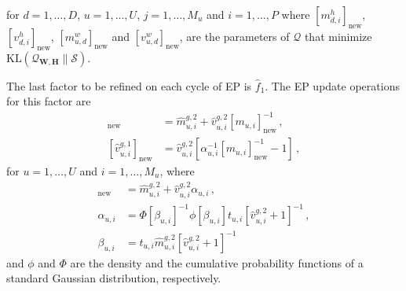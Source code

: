 for $d = 1,\ldots,D$, $u = 1,\ldots,U$, $j = 1,\ldots,M_u$ and $i = 1,\ldots,P$ where $[m_{d,i}^{h}]_\text{new}$,
$[v_{d,i}^{h}]_\text{new}$, $[ m_{u,d}^{w}]_\text{new}$ and $[v_{u,d}^{w}]_\text{new}$, are the parameters of $\mathcal{Q}$ that minimize
$\text{KL}(\mathcal{Q}_{\mathbf{W},\mathbf{H}}\|\mathcal{S})$.

The last factor to be refined on each cycle of EP is $\hat{f}_1$. The EP update operations for this factor are
\begin{align}
[\hat{m}_{u,i}^{g,1}]_\text{new} & = \hat{m}_{u,i}^{g,2} + \hat{v}_{u,i}^{g,2}
[m_{u,i}]^{-1}_\text{new}\,,\\
[\hat{v}_{u,i}^{g,1}]_\text{new} & = \hat{v}_{u,i}^{g,2} \left[ \alpha_{u,i}^{-1} [m_{u,i}]^{-1}_\text{new} - 1 \right]\,,
\end{align}
for $u = 1,\ldots,U$ and $i = 1,\ldots,M_u$, where
\begin{align}
[m_{u,i}]_\text{new} & = \hat{m}_{u,i}^{g,2} + \hat{v}_{u,i}^{g,2} \alpha_{u,i}\,,\\
\alpha_{u,i} & = \Phi[\beta_{u,i}]^{-1} \phi[\beta_{u,i}] t_{u,i} [\hat{v}_{u,i}^{g,2} + 1]^{-1}\,,\\
\beta_{u,i} & = t_{u,i} \hat{m}_{u,i}^{g,2} [\hat{v}_{u,i}^{g,2} + 1]^{-1}
\end{align}
and $\phi$ and $\Phi$ are the density and the cumulative probability functions of a standard Gaussian distribution,
respectively.

